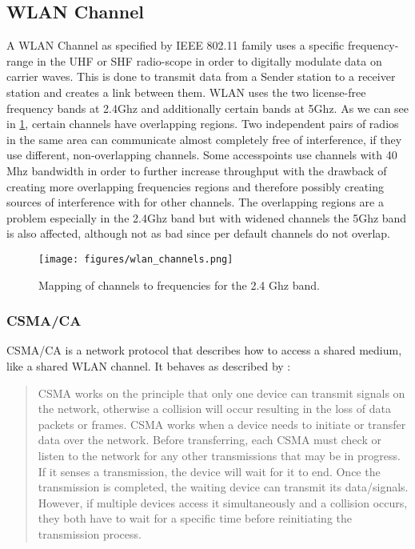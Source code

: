   \subsection{\ac{WLAN} Channel}
    A \ac{WLAN} Channel as specified by IEEE 802.11 family uses a specific frequency-range in the \ac{UHF} or \ac{SHF} radio-scope in order 
    to digitally modulate data on carrier waves.
    This is done to transmit data from a Sender station to a receiver station and creates a link between them.
    \ac{WLAN} uses the two license-free frequency bands at 2.4Ghz and additionally certain bands at 5Ghz.
    As we can see in \ref{fig:wlan_channels}, certain channels have overlapping regions. 
    Two independent pairs of radios in the same area can communicate almost completely free of interference, if they use different, non-overlapping channels.
    Some accesspoints use channels with 40 Mhz bandwidth in order to further increase throughput with the drawback of creating more overlapping frequencies regions
    and therefore possibly creating sources of interference with for other channels.
    The overlapping regions are a problem especially in the 2.4Ghz band but with widened channels the 5Ghz band is also affected, although not as bad since per default
    channels do not overlap.
    
    \begin{figure}[h!]
      \centering
      \texttt{[image: figures/wlan\_channels.png]}
      \caption{Mapping of channels to frequencies for the 2.4 Ghz band. \cite{wlan_channels}}
      \label{fig:wlan_channels}
    \end{figure}
    
      \subsubsection{\ac{CSMA/CA}}
	\ac{CSMA/CA} is a network protocol that describes how to access a shared medium, like a shared WLAN channel.
	It behaves as described by \cite{csma_techo}:
	
	\begin{quotation}
	  CSMA works on the principle that only one device can transmit signals on the network, 
	  otherwise a collision will occur resulting in the loss of data packets or frames. 
	  CSMA works when a device needs to initiate or transfer data over the network. 
	  Before transferring, each CSMA must check or listen to the network for any other transmissions that may be in progress. 
	  If it senses a transmission, the device will wait for it to end. Once the transmission is completed, 
	  the waiting device can transmit its data/signals. However, if multiple devices access it simultaneously and a collision occurs, 
	  they both have to wait for a specific time before reinitiating the transmission process. 
	\end{quotation}
	
